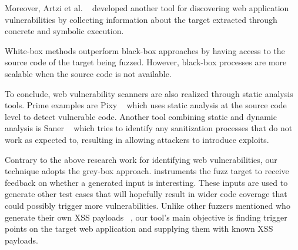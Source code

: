 Moreover, Artzi et al. ~\cite{artzi2010finding} developed another tool for discovering web
application vulnerabilities by collecting information about the target extracted through concrete and symbolic execution.

White-box methods outperform black-box approaches by having access to the source code of the target being fuzzed. However, black-box processes are more scalable when the source code is not 
available. 

To conclude, web vulnerability scanners are also realized through static analysis tools. Prime examples are Pixy ~\cite{jovanovic2006pixy} which uses static analysis at the source code
level to detect vulnerable code. Another tool combining static and dynamic analysis is Saner ~\cite{balzarotti2008saner} which tries to identify any sanitization processes that do not work as expected to, resulting in allowing attackers to introduce exploits.

Contrary to the above research work for identifying web vulnerabilities, our technique adopts the
grey-box approach. \pname{} instruments the fuzz target to receive feedback on whether a generated input is interesting. These inputs are used to generate other test cases that will hopefully result in wider code coverage that could possibly trigger more vulnerabilities. Unlike other fuzzers mentioned who generate their own XSS payloads ~\cite{duchene2014kameleonfuzz}, our tool's  main objective is finding trigger points on the target web application and supplying them with known XSS payloads.